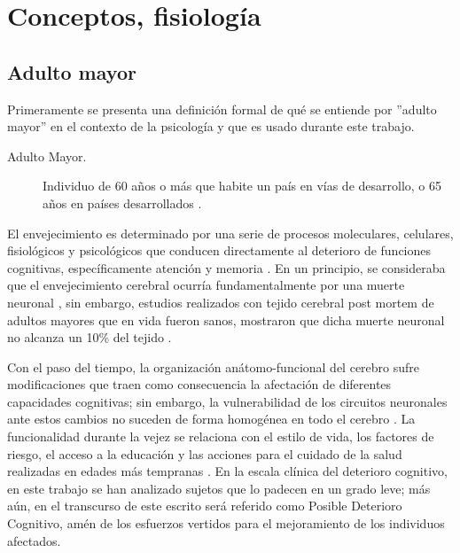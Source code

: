 \documentclass[12pt,a4paper]{mitthesis}
\begin{document}

\section{Conceptos, fisiolog\'ia}

\subsection{Adulto mayor}

Primeramente se presenta una definici\'on formal de qu\'e se entiende por ''adulto mayor'' en el 
contexto de la psicolog\'ia y que es usado durante este trabajo.

\begin{description}
\item[Adulto Mayor.] Individuo de 60 a\~nos o m\'as que habite un pa\'is en v\'ias de desarrollo, o 
65 a\~nos en pa\'ises desarrollados \cite{Hita14}.
\end{description}

El envejecimiento es determinado por una serie de procesos moleculares, celulares, fisiol\'ogicos y 
psicol\'ogicos que conducen directamente al deterioro de funciones cognitivas, espec\'ificamente 
atenci\'on y memoria \cite{Navarrete03,Park09}. 
En un principio, se consideraba que el envejecimiento cerebral ocurr\'ia fundamentalmente por una 
muerte neuronal \cite{Coleman87}, sin embargo, estudios realizados con tejido cerebral post mortem 
de adultos mayores que en vida fueron sanos, mostraron que dicha muerte neuronal no alcanza un 10\% 
del tejido \cite{Esiri07}. 

Con el paso del tiempo, la organizaci\'on an\'atomo-funcional del cerebro sufre modificaciones que 
traen como consecuencia la afectaci\'on de diferentes capacidades cognitivas; sin embargo, la 
vulnerabilidad de los circuitos neuronales ante estos cambios no suceden de forma homog\'enea en 
todo el cerebro \cite{Hita14}.
La funcionalidad durante la vejez se relaciona con el estilo de vida, los factores de riesgo, el 
acceso a la educaci\'on y las acciones para el cuidado de la salud realizadas en edades m\'as 
tempranas \cite{Ohayon04,Sanhueza14}.
En la escala cl\'inica del deterioro cognitivo, en este trabajo se han analizado sujetos que lo
padecen en un grado leve; m\'as a\'un, en el transcurso de este escrito ser\'a referido como 
Posible Deterioro Cognitivo, am\'en de los esfuerzos vertidos para el mejoramiento de los 
individuos afectados.
\end{document}
